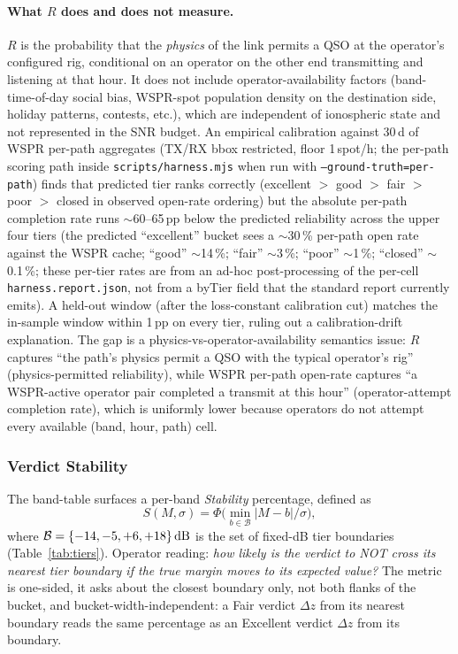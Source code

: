 \documentclass[11pt,a4paper]{article}
\newcommand{\si}[1]{\text{#1}}
\newcommand{\dB}{\text{dB}}
\begin{document}
\paragraph{What $R$ does and does not measure.}  $R$ is the
probability that the \emph{physics} of the link permits a QSO at
the operator's configured rig, conditional on an operator on the
other end transmitting and listening at that hour.  It does not
include operator-availability factors (band-time-of-day social bias,
WSPR-spot population density on the destination side, holiday
patterns, contests, etc.), which are independent of ionospheric
state and not represented in the SNR budget.  An empirical
calibration against 30\,d of WSPR per-path aggregates (TX/RX bbox
restricted, floor 1\,spot/h; the per-path scoring path inside
\texttt{scripts/harness.mjs} when run with
\texttt{--ground-truth=per-path})
finds that predicted tier ranks correctly (excellent $>$ good $>$
fair $>$ poor $>$ closed in observed open-rate ordering) but the
absolute per-path completion rate runs $\sim$60--65\,pp below the
predicted reliability across the upper four tiers (the predicted
``excellent'' bucket sees a $\sim$30\,\% per-path open rate against
the WSPR cache; ``good'' $\sim$14\,\%; ``fair'' $\sim$3\,\%; ``poor''
$\sim$1\,\%; ``closed'' $\sim$0.1\,\%; these per-tier rates are
from an ad-hoc post-processing of the per-cell
\texttt{harness.report.json}, not from a byTier field that the
standard report currently emits).  A held-out window
(after the loss-constant calibration cut)
matches the in-sample window within 1\,pp on every tier, ruling out
a calibration-drift explanation.  The gap is a
physics-vs-operator-availability semantics issue: $R$ captures
``the path's physics permit a QSO with the typical operator's rig''
(physics-permitted reliability), while WSPR per-path open-rate
captures ``a WSPR-active operator pair completed a transmit at
this hour'' (operator-attempt completion rate), which is uniformly
lower because operators do not attempt every available
(band, hour, path) cell.

\subsubsection{Verdict Stability}\label{sec:tier-confidence}

The band-table surfaces a per-band \emph{Stability} percentage,
defined as
\begin{equation}\label{eq:tierstab}
  S(M, \sigma) = \Phi\!\bigl(\min_{b \in \mathcal{B}} |M - b| / \sigma\bigr),
\end{equation}
where $\mathcal{B} = \{-14, -5, +6, +18\}\,\si{\dB}$ is the set
of fixed-dB tier boundaries (Table~\ref{tab:tiers}).
Operator reading:
\emph{how likely is the verdict to NOT cross its nearest tier
boundary if the true margin moves to its expected value?} The
metric is one-sided, it asks about the closest boundary only, not
both flanks of the bucket, and bucket-width-independent: a Fair
verdict $\Delta z$ from its nearest boundary reads the same
percentage as an Excellent verdict $\Delta z$ from its boundary.
\end{document}
